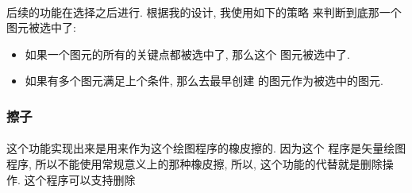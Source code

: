 \documentclass{article}
\begin{document}
			\paragraph{}
				后续的功能在选择之后进行. 根据我的设计, 我使用如下的策略
				来判断到底那一个图元被选中了:
				\begin{itemize}
					\item 如果一个图元的所有的关键点都被选中了, 那么这个
					      图元被选中了.
					\item 如果有多个图元满足上个条件, 那么去最早创建
					      的图元作为被选中的图元.
				\end{itemize}
		\subsubsection{擦子}
			\paragraph{}
				这个功能实现出来是用来作为这个绘图程序的橡皮擦的. 因为这个
				程序是矢量绘图程序, 所以不能使用常规意义上的那种橡皮擦, 
				所以, 这个功能的代替就是删除操作. 这个程序可以支持删除
\end{document}
